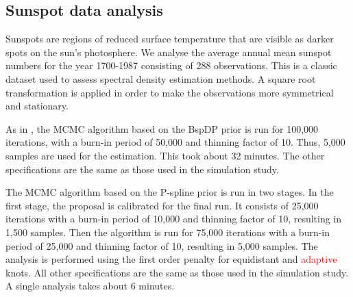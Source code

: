 \documentclass[twocolumn,final]{svjour3}
\begin{document}
\subsection{Sunspot data analysis}
Sunspots are regions of reduced surface temperature that are visible as darker spots on the sun's photosphere.
We analyse the average annual mean sunspot numbers for the year 1700-1987 consisting of  288 observations.  This is a classic dataset used to assess spectral density estimation methods.  A square root transformation is applied in order to make the observations more symmetrical and stationary. 

As in \cite{Edwards2019}, the MCMC algorithm based on the BspDP prior  is run for 100,000 iterations, with a burn-in period of 50,000 and thinning factor of 10.  Thus, 5,000 samples are used for the estimation.  This took about 32 minutes.  The other specifications are the same as those used in the simulation study.

The MCMC algorithm based on the P-spline prior is run in two stages.  In  the first stage, the proposal  is calibrated for the final run.  It consists of 25,000 iterations with a burn-in period of 10,000 and thinning factor of 10, resulting in 1,500 samples.  Then the algorithm is run for 75,000 iterations with a burn-in period of 25,000 and thinning factor of 10, resulting in 5,000 samples.  The analysis is performed using the first order penalty for equidistant and \textcolor{red}{adaptive} knots.   All other specifications are the same as those used in the simulation study.  A single analysis takes about 6 minutes.
\end{document}

